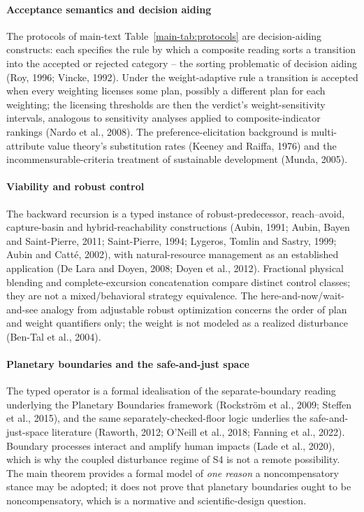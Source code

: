 \paragraph{Acceptance semantics and decision aiding} The protocols of main-text Table~\ref{main-tab:protocols} are decision-aiding constructs: each specifies the rule by which a composite reading sorts a transition into the accepted or rejected category -- the sorting problematic of decision aiding (Roy, 1996; Vincke, 1992). Under the weight-adaptive rule a transition is accepted when every weighting licenses some plan, possibly a different plan for each weighting; the licensing thresholds are then the verdict's weight-sensitivity intervals, analogous to sensitivity analyses applied to composite-indicator rankings (Nardo et al., 2008). The preference-elicitation background is multi-attribute value theory's substitution rates (Keeney and Raiffa, 1976) and the incommensurable-criteria treatment of sustainable development (Munda, 2005).

\paragraph{Viability and robust control} The backward recursion is a typed instance of robust-predecessor, reach--avoid, capture-basin and hybrid-reachability constructions (Aubin, 1991; Aubin, Bayen and Saint-Pierre, 2011; Saint-Pierre, 1994; Lygeros, Tomlin and Sastry, 1999; Aubin and Catt\'e, 2002), with natural-resource management as an established application (De Lara and Doyen, 2008; Doyen et al., 2012). Fractional physical blending and complete-excursion concatenation compare distinct control classes; they are not a mixed/behavioral strategy equivalence. The here-and-now/wait-and-see analogy from adjustable robust optimization concerns the order of plan and weight quantifiers only; the weight is not modeled as a realized disturbance (Ben-Tal et al., 2004).

\paragraph{Planetary boundaries and the safe-and-just space} The typed operator is a formal idealisation of the separate-boundary reading underlying the Planetary Boundaries framework (Rockstr\"om et al., 2009; Steffen et al., 2015), and the same separately-checked-floor logic underlies the safe-and-just-space literature (Raworth, 2012; O'Neill et al., 2018; Fanning et al., 2022). Boundary processes interact and amplify human impacts (Lade et al., 2020), which is why the coupled disturbance regime of S4 is not a remote possibility. The main theorem provides a formal model of \emph{one reason} a noncompensatory stance may be adopted; it does not prove that planetary boundaries ought to be noncompensatory, which is a normative and scientific-design question.

